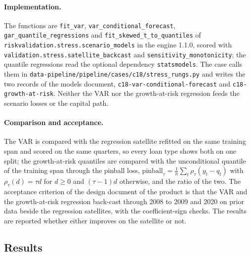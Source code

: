 \paragraph{Implementation.}
The functions are \texttt{fit\_var}, \texttt{var\_\allowbreak conditional\_\allowbreak forecast}, \texttt{gar\_\allowbreak quantile\_\allowbreak regressions} and
\texttt{fit\_\allowbreak skewed\_\allowbreak t\_\allowbreak to\_\allowbreak quantiles} of \texttt{riskvalidation.\allowbreak stress.\allowbreak scenario\_\allowbreak models} in the engine 1.1.0, scored with
\texttt{validation.\allowbreak stress.\allowbreak satellite\_\allowbreak backcast} and \texttt{sensitivity\_\allowbreak monotonicity}; the quantile regressions read the optional
dependency \texttt{statsmodels}. The case calls them in
\texttt{data-pipeline/pipeline/cases/c18/stress\_\allowbreak rungs.\allowbreak py} and writes the two records of the models document,
\texttt{c18-var-conditional-forecast} and \texttt{c18-growth-at-risk}. Neither the VAR nor the growth-at-risk regression feeds the scenario losses or the capital path.

\paragraph{Comparison and acceptance.}
The VAR is compared with the regression satellite refitted on the same training span and scored on the same quarters, so every
loan type shows both on one split; the growth-at-risk quantiles are compared with the unconditional quantile of the training span
through the pinball loss, $\mathrm{pinball}_\tau=\tfrac1n\sum_t\rho_\tau(y_t-q_t)$ with $\rho_\tau(d)=\tau d$ for $d\ge 0$ and
$(\tau-1)d$ otherwise, and the ratio of the two. The acceptance criterion of the design document of the product is that the VAR and the growth-at-risk regression back-cast through 2008 to
2009 and 2020 on prior data beside the regression satellites, with the coefficient-sign checks. The results are reported
whether either improves on the satellite or not.

\subsection{Results}
\label{sec:results-aggregation-stress}

